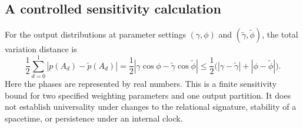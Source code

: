 \subsection{A controlled sensitivity calculation}

For the output distributions at parameter settings $(\gamma,\phi)$ and
$(\widetilde\gamma,\widetilde\phi)$, the total variation distance is
\begin{equation}
  \frac12\sum_{d=0}^1|p(A_d)-\widetilde p(A_d)|
   =\frac12|\gamma\cos\phi-\widetilde\gamma\cos\widetilde\phi|
   \leq\frac12\bigl(|\gamma-\widetilde\gamma|
                      +|\phi-\widetilde\phi|\bigr).
  \label{eq:toysensitivity}
\end{equation}
Here the phases are represented by real numbers. This is a finite
sensitivity bound for two specified weighting parameters and one output
partition. It does not establish universality under changes to the
relational signature, stability of a spacetime, or persistence under an
internal clock.

